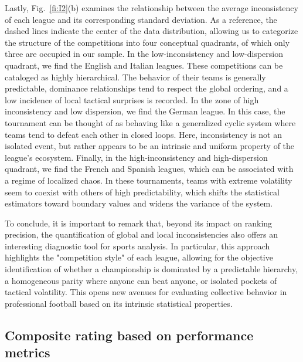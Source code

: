 \documentclass[preprint,12pt]{elsarticle}
\begin{document}
{Lastly, Fig.~\ref{fi:I2}(b) examines the relationship between the average inconsistency of each league and its corresponding standard deviation. As a reference, the dashed lines indicate the center of the data distribution, allowing us to categorize the structure of the competitions into four conceptual quadrants, of which only three are occupied in our sample. 
%
In the low-inconsistency and low-dispersion quadrant, we find the English and Italian leagues. These competitions can be cataloged as highly hierarchical. The behavior of their teams is generally predictable, dominance relationships tend to respect the global ordering, and a low incidence of local tactical surprises is recorded.
%
In the zone of high inconsistency and low dispersion, we find the German league. In this case, the tournament can be thought of as behaving like a generalized cyclic system where teams tend to defeat each other in closed loops. Here, inconsistency is not an isolated event, but rather appears to be an intrinsic and uniform property of the league's ecosystem.
%
Finally, in the high-inconsistency and high-dispersion quadrant, we find the French and Spanish leagues, which can be associated with a regime of localized chaos. In these tournaments, teams with extreme volatility seem to coexist with others of high predictability, which shifts the statistical estimators toward boundary values and widens the variance of the system.

To conclude, it is important to remark that, beyond its impact on ranking precision, the quantification of global and local inconsistencies also offers an interesting diagnostic tool for sports analysis. 
%
In particular, this approach highlights the "competition style" of each league, allowing for the objective identification of whether a championship is dominated by a predictable hierarchy, a homogeneous parity where anyone can beat anyone, or isolated pockets of tactical volatility. This opens new avenues for evaluating collective behavior in professional football based on its intrinsic statistical properties.
}




\subsection{Composite rating based on performance metrics}
\label{sse:comp}
\end{document}
